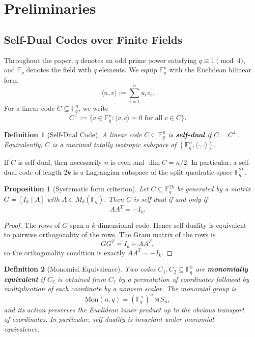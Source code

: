 \documentclass[12pt]{article}
\newtheorem{defn}{Definition}[section]
\newtheorem{prop}[theorem]{Proposition}
\newcommand{\F}{\mathbb{F}}
\newcommand{\Mon}{\mathrm{Mon}}
\begin{document}
\section{Preliminaries}
\label{sec:background}

\subsection{Self-Dual Codes over Finite Fields}

Throughout the paper, $q$ denotes an odd prime power satisfying $q \equiv 1 \pmod 4$, and $\F_q$ denotes the field with $q$ elements. We equip $\F_q^n$ with the Euclidean bilinear form
\[
\langle u,v\rangle := \sum_{i=1}^n u_i v_i.
\]
For a linear code $C \subseteq \F_q^n$, we write
\[
C^\perp := \{v \in \F_q^n : \langle v,c\rangle = 0 \text{ for all } c \in C\}.
\]

\begin{defn}[Self-Dual Code]\label{def:sd}
A linear code $C \subseteq \F_q^n$ is \textbf{self-dual} if $C = C^{\perp}$. Equivalently, $C$ is a maximal totally isotropic subspace of $(\F_q^n,\langle \cdot,\cdot\rangle)$.
\end{defn}

\noindent
If $C$ is self-dual, then necessarily $n$ is even and $\dim C = n/2$. In particular, a self-dual code of length $2k$ is a Lagrangian subspace of the split quadratic space $\F_q^{2k}$.

\begin{prop}[Systematic form criterion]\label{prop:systematic-form}
Let $C \subseteq \F_q^{2k}$ be generated by a matrix $G = [I_k \mid A]$ with $A \in M_k(\F_q)$. Then $C$ is self-dual if and only if
\[
AA^T = -I_k.
\]
\end{prop}

\begin{proof}
The rows of $G$ span a $k$-dimensional code. Hence self-duality is equivalent to pairwise orthogonality of the rows. The Gram matrix of the rows is
\[
GG^T = I_k + AA^T,
\]
so the orthogonality condition is exactly $AA^T = -I_k$.
\end{proof}

\begin{defn}[Monomial Equivalence]\label{def:mon-equiv}
Two codes $C_1, C_2 \subseteq \F_q^n$ are \textbf{monomially equivalent} if $C_2$ is obtained from $C_1$ by a permutation of coordinates followed by multiplication of each coordinate by a nonzero scalar. The monomial group is
\[
\Mon(n,q) = (\F_q^\times)^n \rtimes S_n,
\]
and its action preserves the Euclidean inner product up to the obvious transport of coordinates. In particular, self-duality is invariant under monomial equivalence.
\end{defn}
\end{document}
